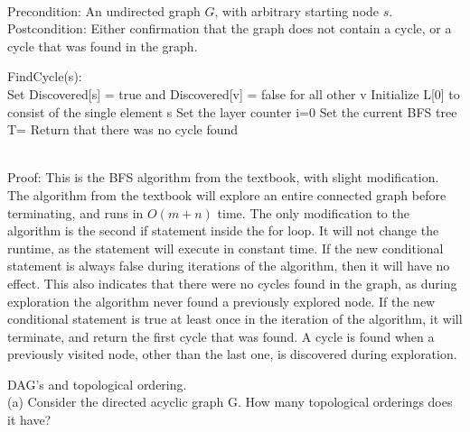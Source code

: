 \documentclass{assignment}
\begin{document}
\begin{problemlist}
\begin{problem}
\end{problem}
\begin{answer}
\\
Precondition: An undirected graph $G$, with arbitrary starting node $s$.\\
Postcondition: Either confirmation that the graph does not contain a cycle, or a cycle that was found in the graph.\\
\begin{algorithm}
  FindCycle(s):{\\
    Set Discovered[s] = true and Discovered[v] = false for all other v\;
    Initialize L[0] to consist of the single element s\;
    Set the layer counter i=0\;
    Set the current BFS tree T=\null\;
    Return that there was no cycle found\;
  }
\end{algorithm}
\\Proof: This is the BFS algorithm from the textbook, with slight modification. The algorithm from the textbook will explore an entire connected graph before terminating, and runs in $O(m+n)$ time. The only modification to the algorithm is the second if statement inside the for loop. It will not change the runtime, as the statement will execute in constant time. If the new conditional statement is always false during iterations of the algorithm, then it will have no effect. This also indicates that there were no cycles found in the graph, as during exploration the algorithm never found a previously explored node. If the new conditional statement is true at least once in the iteration of the algorithm, it will terminate, and return the first cycle that was found. A cycle is found when a previously visited node, other than the last one, is discovered during exploration.\\ 
\end{answer}
\pbitem
\begin{problem}
DAG's and topological ordering.\\
(a) Consider the directed acyclic graph G. How many topological orderings does it have?\\

\end{problem}
\end{problemlist}
\end{document}
